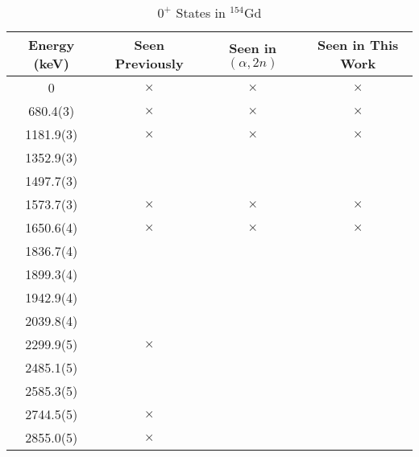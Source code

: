 \begin{table}[]
    \centering
    \caption{$0^+$ States in $^{154}$Gd}
    \label{tab:0plus_154}
    \begin{tabular}{c|c|c|c}
        Energy (keV) & Seen Previously & Seen in $(\alpha,2n)$ & Seen in This Work  \\
        \toprule
        0 & $\times$ & $\times$ & $\times$\\
        680.4(3) & $\times$ & $\times$ & $\times$\\
        1181.9(3) & $\times$ & $\times$ & $\times$\\
        1352.9(3) & & &\\
        1497.7(3) & & &\\
        1573.7(3) & $\times$ & $\times$ & $\times$\\
        1650.6(4) & $\times$ & $\times$ & $\times$\\
        1836.7(4) & & &\\
        1899.3(4) & & &\\
        1942.9(4) & & &\\
        2039.8(4) & & &\\
        2299.9(5) & $\times$ & &\\
        2485.1(5) & & &\\
        2585.3(5) & & &\\
        2744.5(5) & $\times$ & &\\
        2855.0(5) & $\times$ & &\\
        \bottomrule
    \end{tabular}
\end{table}